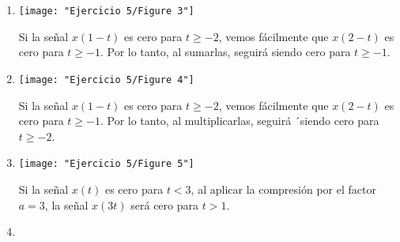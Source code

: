 \begin{enumerate}[label=\color{red}\textbf{\arabic*)}]
\begin{enumerate}[label=\color{red}\textbf{\alph*)}]
      \item {} 

\begin{minipage}{0.45\textwidth}
\texttt{[image: "Ejercicio 5/Figure 3"]} 
\end{minipage}\begin{minipage}{0.45\textwidth}
Si la señal $x(1-t)$ es cero para  $t\ge -2$, vemos fácilmente que $x(2-t)$ es cero para  $t\ge -1$. Por lo tanto, al sumarlas, seguirá siendo cero para $t\ge -1$.
\end{minipage}

      \item {} 
      
      \begin{minipage}{0.45\textwidth}
      \texttt{[image: "Ejercicio 5/Figure 4"]}
      \end{minipage} \begin{minipage}{0.45\textwidth}
      Si la señal $x(1-t)$ es cero para  $t\ge -2$, vemos fácilmente que $x(2-t)$ es cero para  $t\ge -1$. Por lo tanto, al multiplicarlas, seguirá ´siendo cero para $t\ge -2$.
      \end{minipage}

      \item {} 
      
      \begin{minipage}{0.45\textwidth}
      \texttt{[image: "Ejercicio 5/Figure 5"]}
      \end{minipage} \begin{minipage}{0.45\textwidth}
      Si la señal $x(t)$ es cero para  $t<3$, al aplicar la compresión por el factor  $a=3$, la señal  $x(3t)$ será cero para  $t>1$.
      \end{minipage}

      \item {} 


\end{enumerate}
\end{enumerate}
